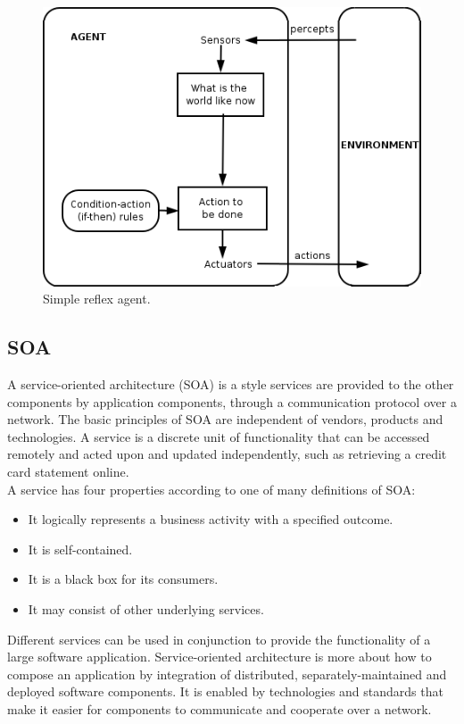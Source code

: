 \documentclass{article}
\begin{document}
\begin{figure}[h]
\centering
\includegraphics[scale=0.7]{mas.png}
\caption{Simple reflex agent.}
\label{fig_mas}
\end{figure}

\newpage	


\subsection{SOA}
A service-oriented architecture (SOA) is a style services are provided to the other components by application components, through a communication protocol over a network. The basic principles of SOA are independent of vendors, products and technologies. A service is a discrete unit of functionality that can be accessed remotely and acted upon and updated independently, such as retrieving a credit card statement online.\\

\noindent A service has four properties according to one of many definitions of SOA:
\begin{itemize}

\item It logically represents a business activity with a specified outcome.
\item It is self-contained.
\item It is a black box for its consumers.
\item It may consist of other underlying services.\\

\end{itemize}
Different services can be used in conjunction to provide the functionality of a large software application. Service-oriented architecture is more about how to compose an application by integration of distributed, separately-maintained and deployed software components. It is enabled by technologies and standards that make it easier for components to communicate and cooperate over a network.\\\\
\end{document}
